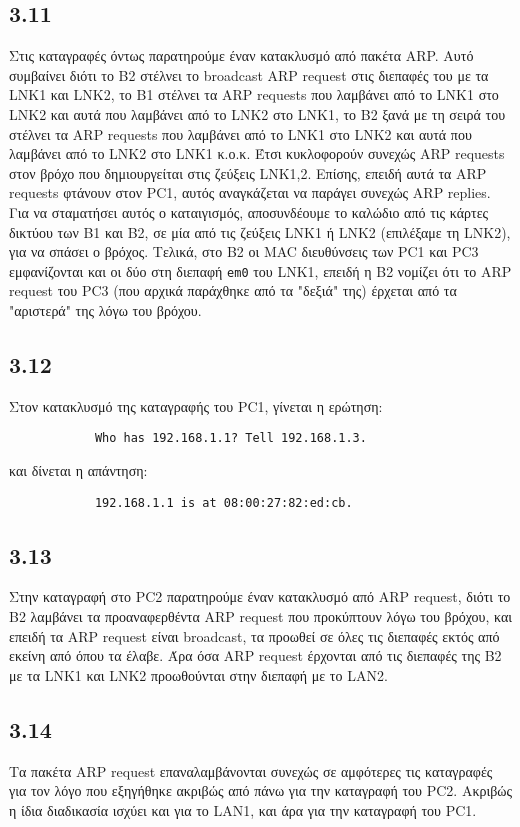 \documentclass[a4paper, 12pt]{article}
\begin{document}
	\subsection*{3.11}
		Στις καταγραφές όντως παρατηρούμε έναν κατακλυσμό από πακέτα ARP. Αυτό συμβαίνει διότι το B2 στέλνει το broadcast ARP request στις διεπαφές του με τα LNK1 και LNK2, το B1 στέλνει τα ARP requests που λαμβάνει από το LNK1 στο LNK2 και αυτά που λαμβάνει από το LNK2 στο LNK1, το B2 ξανά με τη σειρά του στέλνει τα ARP requests που λαμβάνει από το LNK1 στο LNK2 και αυτά που λαμβάνει από το LNK2 στο LNK1 κ.ο.κ. Έτσι κυκλοφορούν συνεχώς ARP requests στον βρόχο που δημιουργείται στις ζεύξεις LNK1,2. Επίσης, επειδή αυτά τα ARP requests φτάνουν στον PC1, αυτός αναγκάζεται να παράγει συνεχώς ARP replies. Για να σταματήσει αυτός ο καταιγισμός, αποσυνδέουμε το καλώδιο από τις κάρτες δικτύου των B1 και B2, σε μία από τις ζεύξεις LNK1 ή LNK2 (επιλέξαμε τη LNK2), για να σπάσει ο βρόχος. Τελικά, στο B2 οι MAC διευθύνσεις των PC1 και PC3 εμφανίζονται και οι δύο στη διεπαφή \verb|em0| του LNK1, επειδή η B2 νομίζει ότι το ARP request του PC3 (που αρχικά παράχθηκε από τα "δεξιά" της) έρχεται από τα "αριστερά" της λόγω του βρόχου. 
		

	\subsection*{3.12} 
		Στον κατακλυσμό της καταγραφής του PC1, γίνεται η ερώτηση:
		
		\begin{verbatim}
			Who has 192.168.1.1? Tell 192.168.1.3.
		\end{verbatim}
		
		και δίνεται η απάντηση:
		\begin{verbatim}
			192.168.1.1 is at 08:00:27:82:ed:cb.
		\end{verbatim}
		
	\subsection*{3.13} 
		Στην καταγραφή στο PC2 παρατηρούμε έναν κατακλυσμό από ARP request, διότι το B2 λαμβάνει τα προαναφερθέντα ARP request που προκύπτουν λόγω του βρόχου, και επειδή τα ARP request είναι broadcast, τα προωθεί σε όλες τις διεπαφές εκτός από εκείνη από όπου τα έλαβε. Άρα όσα ARP request έρχονται από τις διεπαφές της B2 με τα LNK1 και LNK2 προωθούνται στην διεπαφή με το LAN2.
		
	\subsection*{3.14} 
		Τα πακέτα ARP request επαναλαμβάνονται συνεχώς σε αμφότερες τις καταγραφές για τον λόγο που εξηγήθηκε ακριβώς από πάνω για την καταγραφή του PC2. Ακριβώς η ίδια διαδικασία ισχύει και για το LAN1, και άρα για την καταγραφή του PC1.
\end{document}
